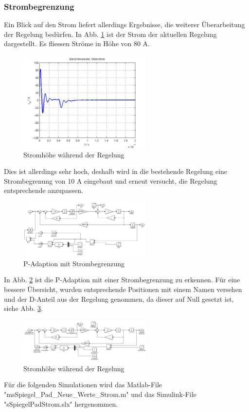 \subsubsection{Strombegrenzung}
\label{chap:p_adaptionstrom}
Ein Blick auf den Strom liefert allerdings Ergebnisse, die weiterer Überarbeitung der Regelung bedürfen.
In Abb. \ref{fig:stromzuhoch} ist der Strom der aktuellen Regelung dargestellt. 
Es fliessen Ströme in Höhe von 80 A.
\begin{figure}[!h]
	\centering
	\includegraphics[width=0.6\textwidth]{Strom_zu_hoch.jpg}
	\caption{Stromhöhe während der Regelung}
	\label{fig:stromzuhoch}
\end{figure}
Dies ist allerdings sehr hoch, deshalb wird in die bestehende Regelung eine Strombegrenung von 10 A eingebaut und erneut versucht, die Regelung entsprechende anzupassen.
\begin{figure}[!h]
	\centering
	\includegraphics[width=0.6\textwidth]{P-Adaption-Strom.jpg}
	\caption{P-Adaption mit Strombegrenzung}
	\label{fig:strombegrenzt}
\end{figure}
In Abb. \ref{fig:strombegrenzt} ist die P-Adaption mit einer Strombegrenzung zu erkennen. 
Für eine bessere Übersicht, wurden entsprechende Positionen mit einem Namen versehen und der D-Anteil aus der Regelung genommen, da dieser auf Null gesetzt ist, siehe
Abb. \ref{fig:strombegrenztsauber}.
\begin{figure}[!h]
	\centering
	\includegraphics[width=0.6\textwidth]{sSpiegelPadStrom.jpg}
	\caption{Stromhöhe während der Regelung}
	\label{fig:strombegrenztsauber}
\end{figure}
Für die folgenden Simulationen wird das Matlab-File "msSpiegel_Pad_Neue_Werte_Strom.m" und das Simulink-File "sSpiegelPadStrom.slx" hergenommen.

